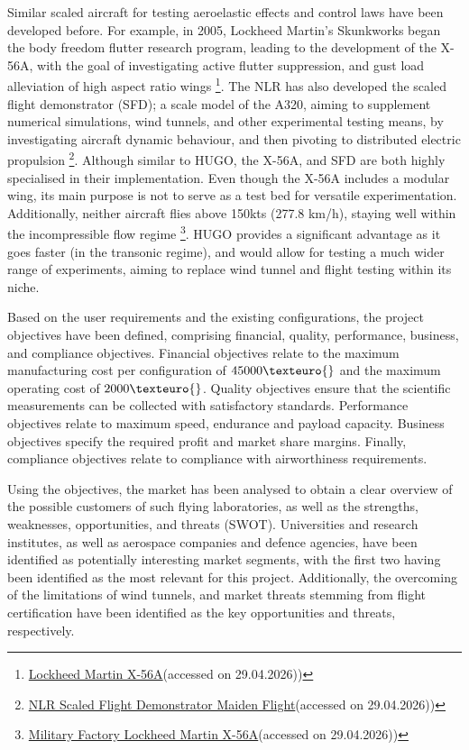 Similar scaled aircraft for testing aeroelastic effects and control laws have been developed before. For example, in 2005, Lockheed Martin's Skunkworks began the body freedom flutter research program, leading to the development of the X-56A, with the goal of investigating active flutter suppression, and gust load alleviation of high aspect ratio wings \footnote{\href{https://www.lockheedmartin.com/en-us/products/X-56A.html}{Lockheed Martin X-56A}(accessed on 29.04.2026))}. The NLR has also developed the scaled flight demonstrator (SFD); a scale model of the A320, aiming to supplement numerical simulations, wind tunnels, and other experimental testing means, by investigating aircraft dynamic behaviour, and then pivoting to distributed electric propulsion \footnote{\label{ref:NLR SFD}\href{https://www.nlr.org/newsroom/nieuws/maiden-flight-of-clean-sky-2s-scaled-flight-demonstrator/}{NLR Scaled Flight Demonstrator Maiden Flight}(accessed on 29.04.2026))}. Although similar to HUGO, the X-56A, and SFD are both highly specialised in their implementation. Even though the X-56A includes a modular wing, its main purpose is not to serve as a test bed for versatile experimentation. Additionally, neither aircraft flies above 150kts (277.8 km/h), staying well within the incompressible flow regime  \footnote{\href{https://www.militaryfactory.com/aircraft/detail.php?aircraft_id=1115}{Military Factory Lockheed Martin X-56A}(accessed on 29.04.2026))}. HUGO provides a significant advantage as it goes faster (in the transonic regime), and would allow for testing a much wider range of experiments, aiming to replace wind tunnel and flight testing within its niche.

Based on the user requirements and the existing configurations, the project objectives have been defined, comprising financial, quality, performance, business, and compliance objectives. Financial objectives relate to the maximum manufacturing cost per configuration of $45000\texteuro{}$ and the maximum operating cost of $2000\texteuro{}$. Quality objectives ensure that the scientific measurements can be collected with satisfactory standards. Performance objectives relate to maximum speed, endurance and payload capacity. Business objectives specify the required profit and market share margins. Finally, compliance objectives relate to compliance with airworthiness requirements.

Using the objectives, the market has been analysed to obtain a clear overview of the possible customers of such flying laboratories, as well as the strengths, weaknesses, opportunities, and threats (SWOT).  Universities and research institutes, as well as aerospace companies and defence agencies, have been identified as potentially interesting market segments, with the first two having been identified as the most relevant for this project. Additionally, the overcoming of the limitations of wind tunnels, and market threats stemming from flight certification have been identified as the key opportunities and threats, respectively.

